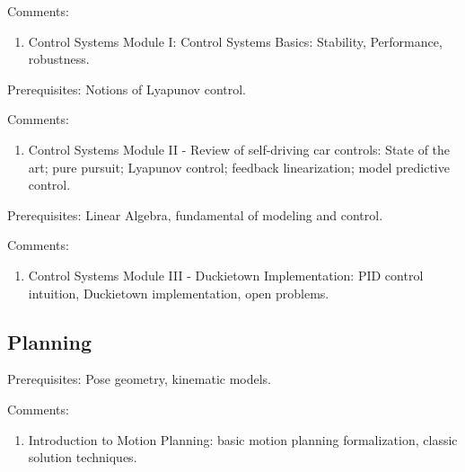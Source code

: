 \documentclass[12pt]{article}
\begin{document}
Comments: 

\begin{enumerate}

	\item Control Systems Module I: Control Systems Basics: Stability, Performance, robustness. 

\end{enumerate}


Prerequisites: Notions of Lyapunov control.

Comments: 

\begin{enumerate}

	\item Control Systems Module II - Review of self-driving car controls: State of the art; pure pursuit; Lyapunov control; feedback linearization; model predictive control.

\end{enumerate}


Prerequisites: Linear Algebra, fundamental of modeling and control.

Comments: 

\begin{enumerate}

	\item Control Systems Module III - Duckietown Implementation: PID control intuition, Duckietown implementation, open problems.

\end{enumerate}


\subsection{Planning}

Prerequisites: Pose geometry, kinematic models.

Comments: 

\begin{enumerate}

	\item Introduction to Motion Planning: basic motion planning formalization, classic solution techniques.

\end{enumerate}
\end{document}
